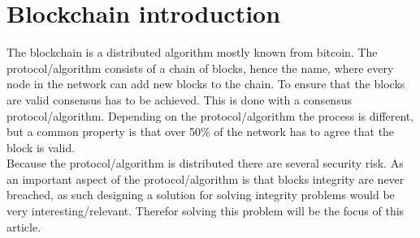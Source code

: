 \section{Blockchain introduction}
The blockchain is a distributed algorithm mostly known from bitcoin. The protocol/algorithm consists of a chain of blocks, hence the name, where every node in the network can add new blocks to the chain. To ensure that the blocks are valid consensus has to be achieved. This is done with a consensus protocol/algorithm. Depending on the protocol/algorithm the process is different, but a common property is that over 50\% of the network has to agree that the block is valid.\\
Because the protocol/algorithm is distributed there are several security risk. As an important aspect of the protocol/algorithm is that blocks integrity are never breached, as such designing a solution for solving integrity problems would be very interesting/relevant. Therefor solving this problem will be the focus of this article.
